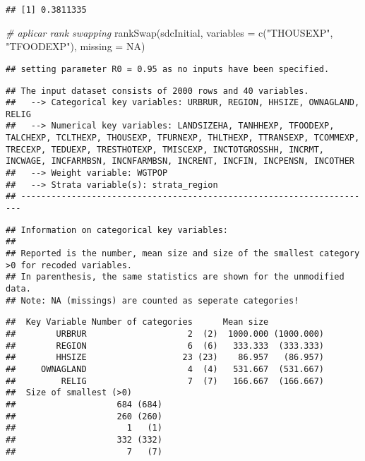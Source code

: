 \documentclass[
]{book}
\newenvironment{Shaded}{\begin{snugshade}}{\end{snugshade}}
\newcommand{\AttributeTok}[1]{\textcolor[rgb]{0.77,0.63,0.00}{#1}}
\newcommand{\CommentTok}[1]{\textcolor[rgb]{0.56,0.35,0.01}{\textit{#1}}}
\newcommand{\ConstantTok}[1]{\textcolor[rgb]{0.00,0.00,0.00}{#1}}
\newcommand{\FunctionTok}[1]{\textcolor[rgb]{0.00,0.00,0.00}{#1}}
\newcommand{\NormalTok}[1]{#1}
\newcommand{\StringTok}[1]{\textcolor[rgb]{0.31,0.60,0.02}{#1}}
\theoremstyle{definition}
\theoremstyle{definition}
\theoremstyle{definition}
\theoremstyle{definition}
\theoremstyle{remark}
\begin{document}
\begin{verbatim}
## [1] 0.3811335
\end{verbatim}

\begin{Shaded}
\begin{Highlighting}[]
\CommentTok{\# aplicar rank swapping}
\FunctionTok{rankSwap}\NormalTok{(sdcInitial, }\AttributeTok{variables =} \FunctionTok{c}\NormalTok{(}\StringTok{"THOUSEXP"}\NormalTok{, }\StringTok{"TFOODEXP"}\NormalTok{), }\AttributeTok{missing =} \ConstantTok{NA}\NormalTok{) }
\end{Highlighting}
\end{Shaded}

\begin{verbatim}
## setting parameter R0 = 0.95 as no inputs have been specified.
\end{verbatim}

\begin{verbatim}
## The input dataset consists of 2000 rows and 40 variables.
##   --> Categorical key variables: URBRUR, REGION, HHSIZE, OWNAGLAND, RELIG
##   --> Numerical key variables: LANDSIZEHA, TANHHEXP, TFOODEXP, TALCHEXP, TCLTHEXP, THOUSEXP, TFURNEXP, THLTHEXP, TTRANSEXP, TCOMMEXP, TRECEXP, TEDUEXP, TRESTHOTEXP, TMISCEXP, INCTOTGROSSHH, INCRMT, INCWAGE, INCFARMBSN, INCNFARMBSN, INCRENT, INCFIN, INCPENSN, INCOTHER
##   --> Weight variable: WGTPOP
##   --> Strata variable(s): strata_region
## ----------------------------------------------------------------------
\end{verbatim}

\begin{verbatim}
## Information on categorical key variables:
## 
## Reported is the number, mean size and size of the smallest category >0 for recoded variables.
## In parenthesis, the same statistics are shown for the unmodified data.
## Note: NA (missings) are counted as seperate categories!
\end{verbatim}

\begin{verbatim}
##  Key Variable Number of categories      Mean size           
##        URBRUR                    2  (2)  1000.000 (1000.000)
##        REGION                    6  (6)   333.333  (333.333)
##        HHSIZE                   23 (23)    86.957   (86.957)
##     OWNAGLAND                    4  (4)   531.667  (531.667)
##         RELIG                    7  (7)   166.667  (166.667)
##  Size of smallest (>0)      
##                    684 (684)
##                    260 (260)
##                      1   (1)
##                    332 (332)
##                      7   (7)
\end{verbatim}
\end{document}
